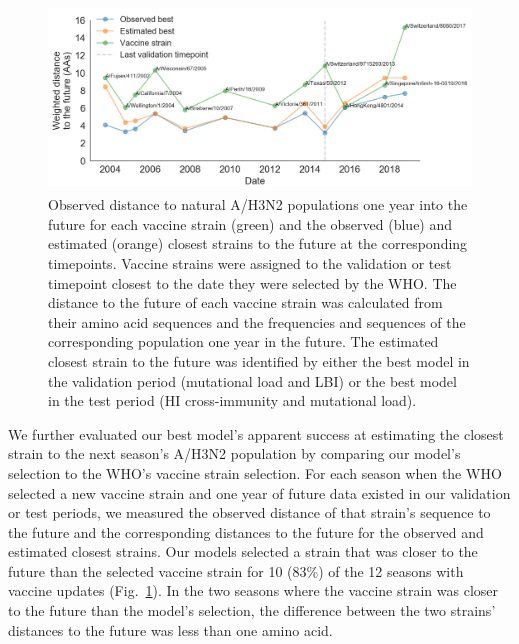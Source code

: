 \begin{figure}[ht]
  \begin{center}
  \includegraphics[width=\textwidth]{figures/vaccine-comparison.png}
  \caption{
    Observed distance to natural A/H3N2 populations one year into the future for each vaccine strain (green) and the observed (blue) and estimated (orange) closest strains to the future at the corresponding timepoints.
    Vaccine strains were assigned to the validation or test timepoint closest to the date they were selected by the WHO.
    The distance to the future of each vaccine strain was calculated from their amino acid sequences and the frequencies and sequences of the corresponding population one year in the future.
    The estimated closest strain to the future was identified by either the best model in the validation period (mutational load and LBI) or the best model in the test period (HI cross-immunity and mutational load).
  }
  \label{fig:vaccine_comparison}
  \end{center}
\end{figure}

We further evaluated our best model's apparent success at estimating the closest strain to the next season's A/H3N2 population by comparing our model's selection to the WHO's vaccine strain selection.
For each season when the WHO selected a new vaccine strain and one year of future data existed in our validation or test periods, we measured the observed distance of that strain's sequence to the future and the corresponding distances to the future for the observed and estimated closest strains.
Our models selected a strain that was closer to the future than the selected vaccine strain for 10 (83\%) of the 12 seasons with vaccine updates (Fig.~\ref{fig:vaccine_comparison}).
In the two seasons where the vaccine strain was closer to the future than the model's selection, the difference between the two strains' distances to the future was less than one amino acid.

